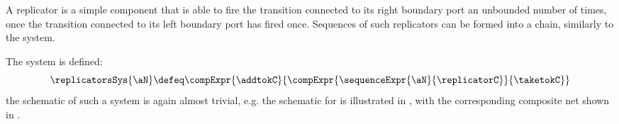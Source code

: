 A replicator is a simple component that is able to fire the transition
connected to its right boundary port an unbounded number of times, once the
transition connected to its left boundary port has fired once. Sequences of
such replicators can be formed into a chain, similarly to the
\iteratedchoiceSys{\aN} system.

\newcommand{\drawRepPlaces}[1]{%
    \node (p0#1) [pnbplace] {};
    \node (p1#1) [pnbplace, below=of p0#1, rotate=180] {};

    \labelledpnbarr{p1#1.out}{p0#1.in}{}{overlay, bend left=45}{}
    \labelledpnbarr[p0p1#1]{p0#1.out}{p1#1.in}{}{overlay, bend left=45}{pos=0.1}
}

\begin{figure}[ht]
    \centering
    \begin{subfigure}{0.5\textwidth}
    \centering
    \caption{\replicatorC {}}
    \label{fig:replicatorC}
    \end{subfigure}%
    \begin{subfigure}{0.5\textwidth}
    \centering
        \caption{\taketokC {}}
    \end{subfigure}%
\end{figure}

The \replicatorsSys{\aN} system is defined:
\[
    \replicatorsSys{\aN} \defeq
    \compExpr{\addtokC}{\compExpr{\sequenceExpr{\aN}{\replicatorC}}{\taketokC}}
\]
the schematic of such a system is again almost trivial, e.g. the
schematic for  is illustrated in
, with the corresponding composite net shown
in .

